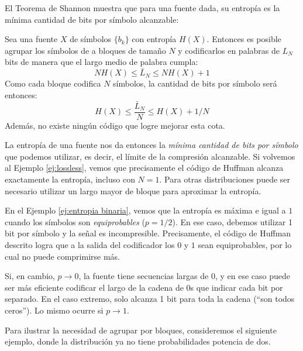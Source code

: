 El Teorema de Shannon muestra que para una fuente dada, su entropía es la mínima cantidad de bits por símbolo alcanzable:
\begin{teorema}\label{teo:shannon fuente}
Sea una fuente $X$ de símbolos $\{b_k\}$ con entropía $H(X)$. Entonces es posible agrupar los símbolos de a bloques de tamaño $N$ y codificarlos en palabras de $L_N$ bits de manera que el largo medio de palabra cumpla:
\begin{equation*}
    N H(X) \leqslant \bar{L}_N \leqslant NH(X) + 1 
\end{equation*}
Como cada bloque codifica $N$ símbolos, la cantidad de bits por símbolo será entonces:
\begin{equation*}
    H(X) \leqslant \frac{\bar{L}_N}{N} \leqslant H(X) + 1/N
\end{equation*}
Además, no existe ningún código que logre mejorar esta cota.
\end{teorema}

La entropía de una fuente nos da entonces la \emph{mínima cantidad de bits por símbolo} que podemos utilizar, es decir, el límite de la compresión alcanzable. Si volvemos al Ejemplo \ref{ej:lossless}, vemos que precisamente el código de Huffman alcanza exactamente la entropía, incluso con $N=1$. Para otras distribuciones puede ser necesario utilizar un largo mayor de bloque para aproximar la entropía.

En el Ejemplo \ref{ej:entropia binaria}, vemos que la entropía es máxima e igual a $1$ cuando los símbolos son \emph{equiprobables} ($p=1/2$). En ese caso, debemos utilizar 1 bit por símbolo y la señal es incompresible. Precisamente, el código de Huffman descrito logra que a la salida del codificador los $0$ y $1$ sean equiprobables, por lo cual no puede comprimirse más.

Si, en cambio, $p\to 0$, la fuente tiene secuencias largas de $0$, y en ese caso puede ser más eficiente codificar el largo de la cadena de $0$s que indicar cada bit por separado. En el caso extremo, solo alcanza 1 bit para toda la cadena (``son todos ceros''). Lo mismo ocurre si $p\to 1$.

Para ilustrar la necesidad de agrupar por bloques, consideremos el siguiente ejemplo, donde la distribución ya no tiene probabilidades potencia de dos.

